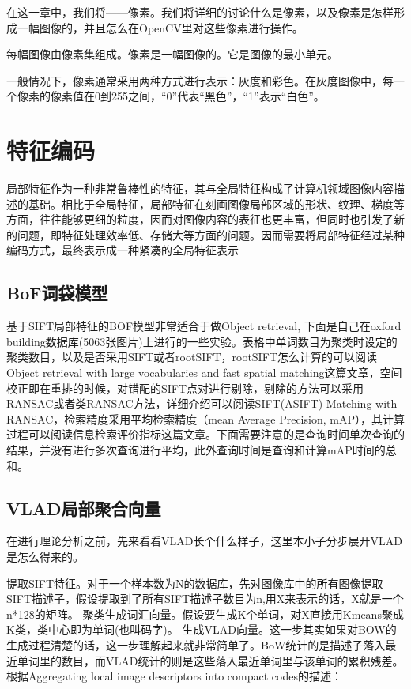 \documentclass[color=cyan,mathpazo,titlestyle=hang]{elegantbook}
\begin{document}
在这一章中，我们将{\color{red}{审查图像的积木}}——像素。我们将详细的讨论什么是像素，以及像素是怎样形成一幅图像的，并且怎么在OpenCV里对这些像素进行操作。

每幅图像由像素集组成。像素是一幅图像的{\color{red}{原材料，积木}}。它是图像的最小单元。

一般情况下，像素通常采用两种方式进行表示：灰度和彩色。在灰度图像中，每一个像素的像素值在0到255之间，“0”代表“黑色”，“1”表示“白色”。

\chapter{特征编码}

局部特征作为一种非常鲁棒性的特征，其与全局特征构成了计算机领域图像内容描述的基础。相比于全局特征，局部特征在刻画图像局部区域的形状、纹理、梯度等方面，往往能够更细的粒度，因而对图像内容的表征也更丰富，但同时也引发了新的问题，即特征处理效率低、存储大等方面的问题。因而需要将局部特征经过某种编码方式，最终表示成一种紧凑的全局特征表示

\section{BoF词袋模型}

基于SIFT局部特征的BOF模型非常适合于做Object retrieval, 下面是自己在oxford building数据库(5063张图片)上进行的一些实验。表格中单词数目为聚类时设定的聚类数目，以及是否采用SIFT或者rootSIFT，rootSIFT怎么计算的可以阅读Object retrieval with large vocabularies and fast spatial matching这篇文章，空间校正即在重排的时候，对错配的SIFT点对进行剔除，剔除的方法可以采用RANSAC或者类RANSAC方法，详细介绍可以阅读SIFT(ASIFT) Matching with RANSAC，检索精度采用平均检索精度（mean Average Precision, mAP），其计算过程可以阅读信息检索评价指标这篇文章。下面需要注意的是查询时间单次查询的结果，并没有进行多次查询进行平均，此外查询时间是查询和计算mAP时间的总和。

\section{VLAD局部聚合向量}

在进行理论分析之前，先来看看VLAD长个什么样子，这里本小子分步展开VLAD是怎么得来的。

提取SIFT特征。对于一个样本数为N的数据库，先对图像库中的所有图像提取SIFT描述子，假设提取到了所有SIFT描述子数目为n,用X来表示的话，X就是一个n*128的矩阵。
聚类生成词汇向量。假设要生成K个单词，对X直接用Kmeans聚成K类，类中心即为单词(也叫码字)。
生成VLAD向量。这一步其实如果对BOW的生成过程清楚的话，这一步理解起来就非常简单了。BoW统计的是描述子落入最近单词里的数目，而VLAD统计的则是这些落入最近单词里与该单词的累积残差。根据Aggregating local image descriptors into compact codes的描述：
\end{document}
